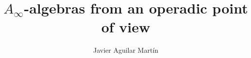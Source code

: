 \documentclass{beamer}
\title{$A_\infty$-algebras from an operadic point of view}
\author{Javier Aguilar Mart\'in}
\institute{University of Kent}
\date{}
\theoremstyle{definition}
\begin{document}
\frame{\titlepage}
%
% 
% 
% 

% 



\newcommand{\seti}{\setcounter{saveenumi}{\value{enumi}}}
\newcommand{\conti}{\setcounter{enumi}{\value{saveenumi}}}

\makeatletter
\newcommand{\xRightarrow}[2][]{\ext@arrow 0359\Rightarrowfill@{#1}{#2}}
\makeatother





%
%
%
%
\end{document}

